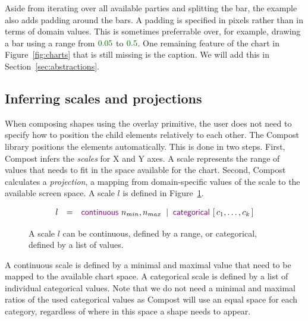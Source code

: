 \documentclass{jfp}
\newcommand{\lsep}{\;\;|\;\;}
\newcommand{\num}[1]{\textcolor{numclr}{#1}}
\newcommand{\kvd}[1]{\textnormal{\textcolor{kvdclr}{\sffamily #1}}}
\begin{document}
\noindent
Aside from iterating over all available parties and splitting the bar, the example also adds padding
around the bars. A padding is specified in pixels rather than in terms of domain values. This is
sometimes preferrable over, for example, drawing a bar using a range from $\num{0.05}$ to $\num{0.5}$.
One remaining feature of the chart in Figure~\ref{fig:charts} that is still missing is the caption.
We will add this in Section~\ref{sec:abstractions}.

\subsection{Inferring scales and projections}

When composing shapes using the \kvd{overlay} primitive, the user does not need to specify how
to position the child elements relatively to each other. The Compost library positions the elements
automatically. This is done in two steps. First, Compost infers the \emph{scales} for X and Y
axes. A scale represents the range of values that needs to fit in the space available for the chart.
Second, Compost calculates a \emph{projection}, a mapping from domain-specific values of the scale
to the available screen space. A scale $l$ is defined in Figure~\ref{fig:scale}.

\begin{figure}
\begin{equation*}
\begin{array}{rcl}
l & = & \kvd{continuous}~n_{min}, n_{max} \lsep \kvd{categorical}~[\,c_1, \ldots, c_k\,]
\end{array}
\end{equation*}
\caption{A scale $l$ can be continuous, defined by a range, or categorical, defined by a list of values.}
\label{fig:scale}
\end{figure}

A continuous scale is defined by a minimal and maximal value that need to be mapped to the
available chart space. A categorical scale is defined by a list of individual categorical values.
Note that we do not need a minimal and maximal ratios of the used categorical values as Compost
will use an equal space for each category, regardless of where in this space a shape needs to
appear.
\end{document}
